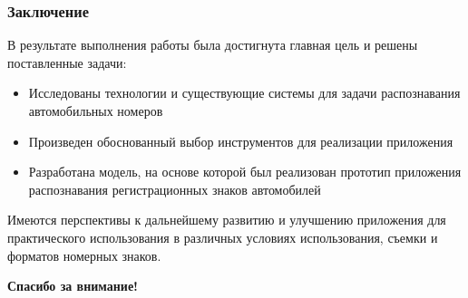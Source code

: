\documentclass{beamer}
\begin{document}

\begin{frame}
\frametitle{Заключение}

В результате выполнения работы была достигнута главная цель и решены поставленные задачи:
\begin{itemize}
    \item Исследованы технологии и существующие системы для задачи распознавания автомобильных номеров
    \item Произведен обоснованный выбор инструментов для реализации приложения
    \item Разработана модель, на основе которой был реализован прототип приложения распознавания регистрационных знаков автомобилей
\end{itemize}

Имеются перспективы к дальнейшему развитию и улучшению приложения для практического использования в различных условиях использования, съемки и форматов номерных знаков. 

\vspace{-0.3em}
\begin{center}\bf\LARGE
Спасибо за внимание!
\end{center}

\end{frame}
\end{document}

